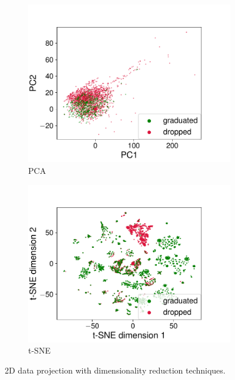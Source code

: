 \documentclass{article}
\begin{document}
\begin{figure}[t!]
  \centering
  \begin{subfigure}{0.49\textwidth}
    \includegraphics[width=\linewidth]{../gfx/pca.pdf}
    \caption{PCA}
    \label{fig:pca}
  \end{subfigure}
  \begin{subfigure}{0.49\textwidth}
    \includegraphics[width=\linewidth]{../gfx/tsne.pdf}
    \caption{t-SNE}
    \label{fig:tsne}
  \end{subfigure}
  \captionsetup{belowskip=-10pt}
  \caption{2D data projection with dimensionality reduction techniques.}
  \label{fig:reduction}
\end{figure}
\end{document}
